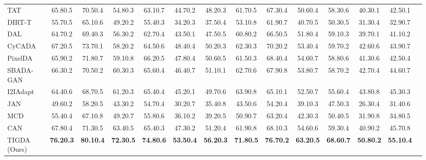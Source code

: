 \documentclass[journal,twoside,web]{IEEEtran}
\begin{document}
\begin{table*}
\begin{center}
{\begin{tabular}{l|cccccc|ccccccc}
   {TAT~\cite{liu2019transferable}}&65.80.5&70.50.4&54.80.3&63.10.7&44.70.2&48.20.3&61.70.5&67.30.4&50.60.4&58.30.6&40.30.1&42.50.1\\
    

   {DIRT-T~\cite{shu2018dirt}}&55.70.5&65.10.6&49.20.2&55.40.3&34.20.3&37.50.4&53.10.8&61.90.7&40.70.5&50.30.5&31.30.4&32.90.7\\

    {DAL~\cite{peng2019domain}}&64.70.2&69.40.3&56.30.2&62.70.4&43.50.1&47.50.5&60.80.2&66.50.5&51.80.4&59.10.3&39.70.1&41.10.2\\
    


    {CyCADA~\cite{hoffman2017cycada}}&67.20.5&73.70.1&58.20.2&64.50.6&48.40.4&50.20.3&62.30.3&70.20.2&53.40.4&59.70.2&42.60.6&43.90.7\\
   


   {PixelDA~\cite{bousmalis2017unsupervised}}&65.90.2&71.80.7&59.10.8&66.20.5&47.80.4&50.60.5&61.50.3&68.40.4&54.60.7&58.80.6&41.30.6&42.50.4\\

    {SBADA-GAN~\cite{russo2018source}}&66.30.2&70.50.2&60.30.3&65.60.4&46.40.7&51.10.1&62.70.6&67.90.8&53.80.7&58.70.2&42.70.4&44.60.7\\
    

    {I2IAdapt~\cite{murez2018image}}&64.40.6&68.70.5&61.20.3&65.40.4&45.20.1&49.70.6&63.90.8&65.10.1&52.50.7&55.60.4&43.80.8&45.30.3\\
    

    {JAN~\cite{long2017deep}}&49.60.2&58.20.5&43.30.2&54.70.4&30.20.7&35.40.8&43.50.6&54.20.4&39.10.3&47.50.3&26.30.4&31.40.6\\

   {MCD~\cite{saito2018maximum}}&55.40.4&67.10.8&49.20.7&55.80.6&36.10.2&39.20.5&50.90.7&63.20.4&42.30.3&50.40.5&31.90.8&34.80.5\\
   

  {CAN~\cite{kang2019contrastive}}&67.80.4&71.30.5&63.40.5&65.40.3&47.30.2&51.20.4&61.90.8&68.10.3&54.60.6&59.30.4&40.90.2&45.70.8\\
  
  {TIGDA (Ours)}&\textbf{76.20.3}&\textbf{80.10.4}&\textbf{72.30.5}&\textbf{74.80.6}&\textbf{53.50.4}&\textbf{56.20.3}&\textbf{71.80.5}&\textbf{76.70.2}&\textbf{63.20.5}&\textbf{68.60.7}&\textbf{50.80.2}&\textbf{55.10.4}\\
    
    \bottomrule
\end{tabular}
}
\end{center}
\label{tab:comp}
\end{table*} 
\end{document}
